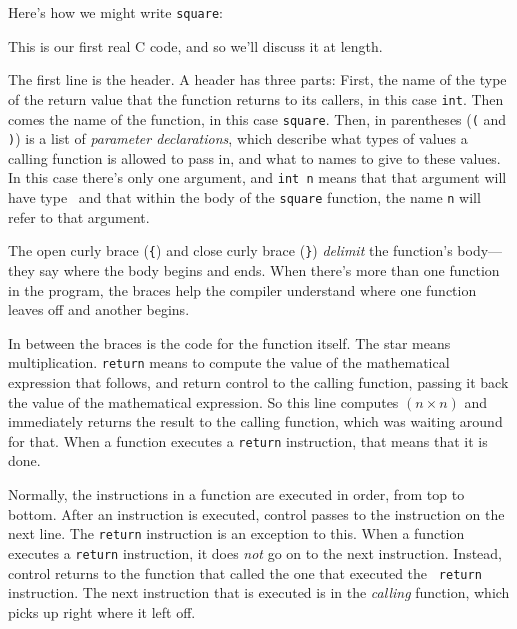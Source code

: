 Here's how we might write {\tt square}:

\begin{flushleft}
    \verb%    int square(int n)%
\\* \verb%    {%
\\* \verb%      return n*n;%
\\* \verb%    }%
\end{flushleft}

\noindent This is our first real C code, and so we'll discuss it at length.

The first line is the header.  A header has three parts: First, the name
of the type of the return value that the function returns to its callers,
in this case {\tt int}.  Then comes the name of the function, in this
case {\tt square}.  Then, in parentheses ({\tt (} and {\tt )}) is a list
of {\em parameter declarations}, which describe what types of values a
calling function is allowed to pass in, and what to names to give to
these values.  In this case there's only one argument, and {\tt int n}
means that that argument will have type \int\ and that within the body
of the {\tt square} function, the name {\tt n} will refer to that
argument.

The open curly brace ({\tt\{}) and close curly brace ({\tt\}}) {\em
delimit}\/ the function's body---they say where the body begins and
ends.  When there's more than one function in the program, the braces help
the compiler understand where one function leaves off and another
begins.

In between the braces is the code for the function itself.  The star
{\tt *} means multiplication.  {\tt return} means to compute the value
of the mathematical expression that follows, and return control to the
calling function, passing it back the value of the mathematical
expression.  So this line computes $(n\times n)$ and immediately returns
the result to the calling function, which was waiting around for that.
When a function executes a {\tt return} instruction, that means that it
is done.

Normally, the instructions in a function are executed in order, from top
to bottom.  After an instruction is executed, control passes to the
instruction on the next line.  The {\tt return} instruction is an
exception to this.  When a function executes a {\tt return} instruction,
it does {\em not}\/ go on to the next instruction.  Instead, control
returns to the function that called the one that executed the {\tt
return} instruction.  The next instruction that is executed is in the
{\em calling} function, which picks up right where it left off.

